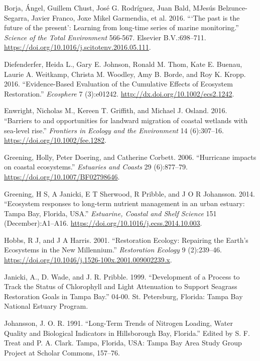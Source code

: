 \documentclass[]{article}
\begin{document}
\leavevmode\hypertarget{ref-Borja16}{}%
Borja, Ángel, Guillem Chust, José G. Rodríguez, Juan Bald,
M\textordfeminine Jesús Belzunce-Segarra, Javier Franco, Joxe Mikel
Garmendia, et al. 2016. ```The past is the future of the present':
Learning from long-time series of marine monitoring.'' \emph{Science of
the Total Environment} 566-567. Elsevier B.V.:698--711.
\url{https://doi.org/10.1016/j.scitotenv.2016.05.111}.

\leavevmode\hypertarget{ref-Diefenderfer16}{}%
Diefenderfer, Heida L., Gary E. Johnson, Ronald M. Thom, Kate E. Buenau,
Laurie A. Weitkamp, Christa M. Woodley, Amy B. Borde, and Roy K. Kropp.
2016. ``Evidence-Based Evaluation of the Cumulative Effects of Ecosystem
Restoration.'' \emph{Ecosphere} 7 (3):e01242.
\url{http://dx.doi.org/10.1002/ecs2.1242}.

\leavevmode\hypertarget{ref-Enwright16}{}%
Enwright, Nicholas M., Kereen T. Griffith, and Michael J. Osland. 2016.
``Barriers to and opportunities for landward migration of coastal
wetlands with sea-level rise.'' \emph{Frontiers in Ecology and the
Environment} 14 (6):307--16. \url{https://doi.org/10.1002/fee.1282}.

\leavevmode\hypertarget{ref-Greening06b}{}%
Greening, Holly, Peter Doering, and Catherine Corbett. 2006. ``Hurricane
impacts on coastal ecosystems.'' \emph{Estuaries and Coasts} 29
(6):877--79. \url{https://doi.org/10.1007/BF02798646}.

\leavevmode\hypertarget{ref-Greening2014}{}%
Greening, H S, A Janicki, E T Sherwood, R Pribble, and J O R Johansson.
2014. ``Ecosystem responses to long-term nutrient management in an urban
estuary: Tampa Bay, Florida, USA.'' \emph{Estuarine, Coastal and Shelf
Science} 151 (December):A1--A16.
\url{https://doi.org/10.1016/j.ecss.2014.10.003}.

\leavevmode\hypertarget{ref-Hobbs01}{}%
Hobbs, R J, and J A Harris. 2001. ``Restoration Ecology: Repairing the
Earth's Ecosystems in the New Millennium.'' \emph{Restoration Ecology} 9
(2):239--46. \url{https://doi.org/10.1046/j.1526-100x.2001.009002239.x}.

\leavevmode\hypertarget{ref-Janicki99}{}%
Janicki, A., D. Wade, and J. R. Pribble. 1999. ``Development of a
Process to Track the Status of Chlorophyll and Light Attenuation to
Support Seagrass Restoration Goals in Tampa Bay.'' 04-00. St.
Petersburg, Florida: Tampa Bay National Estuary Program.

\leavevmode\hypertarget{ref-Johansson91}{}%
Johansson, J. O. R. 1991. ``Long-Term Trends of Nitrogen Loading, Water
Quality and Biological Indicators in Hillsborough Bay, Florida.'' Edited
by S. F. Treat and P. A. Clark. Tampa, Florida, USA: Tampa Bay Area
Study Group Project at Scholar Commons, 157--76.
\end{document}
